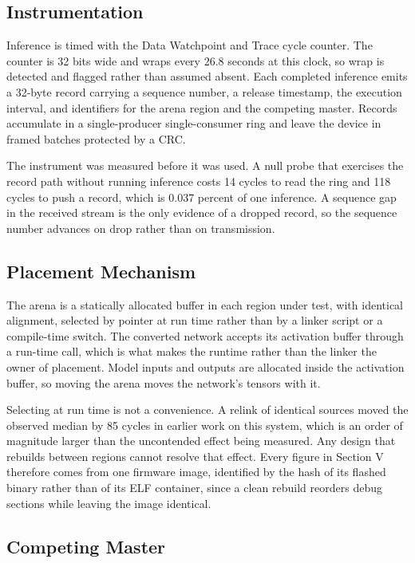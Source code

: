 \documentclass[conference]{IEEEtran}
\begin{document}
\subsection{Instrumentation}

Inference is timed with the Data Watchpoint and Trace cycle counter. The
counter is 32 bits wide and wraps every 26.8 seconds at this clock, so
wrap is detected and flagged rather than assumed absent. Each completed
inference emits a 32-byte record carrying a sequence number, a release
timestamp, the execution interval, and identifiers for the arena region
and the competing master. Records accumulate in a single-producer
single-consumer ring and leave the device in framed batches protected by
a CRC.

The instrument was measured before it was used. A null probe that
exercises the record path without running inference costs 14 cycles to
read the ring and 118 cycles to push a record, which is 0.037 percent of
one inference. A sequence gap in the received stream is the only evidence
of a dropped record, so the sequence number advances on drop rather than
on transmission.

\subsection{Placement Mechanism}

The arena is a statically allocated buffer in each region under test,
with identical alignment, selected by pointer at run time rather than by
a linker script or a compile-time switch. The converted network accepts
its activation buffer through a run-time call, which is what makes the
runtime rather than the linker the owner of placement. Model inputs and
outputs are allocated inside the activation buffer, so moving the arena
moves the network's tensors with it.

Selecting at run time is not a convenience. A relink of identical sources
moved the observed median by 85 cycles in earlier work on this system,
which is an order of magnitude larger than the uncontended effect being
measured. Any design that rebuilds between regions cannot resolve that
effect. Every figure in Section V therefore comes from one firmware
image, identified by the hash of its flashed binary rather than of its
ELF container, since a clean rebuild reorders debug sections while
leaving the image identical.

\subsection{Competing Master}
\end{document}
